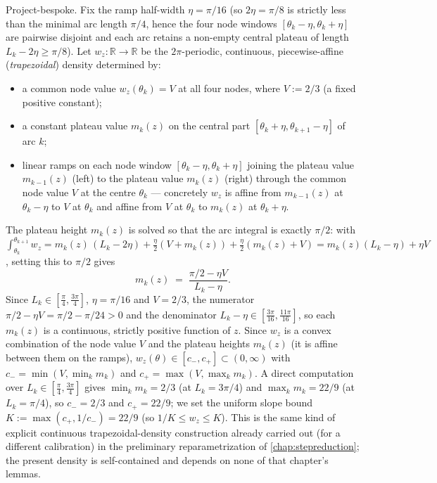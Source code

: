 \begin{definition}
  \label{def:align_density}
  Project-bespoke. Fix the ramp half-width $\eta=\pi/16$ (so $2\eta=\pi/8$ is
  strictly less than the minimal arc length $\pi/4$, hence the four node windows
  $[\theta_k-\eta,\theta_k+\eta]$ are pairwise disjoint and each arc retains a
  non-empty central plateau of length $L_k-2\eta\ge\pi/8$). Let $w_z:\mathbb R\to\mathbb R$
  be the $2\pi$-periodic, continuous, piecewise-affine
  (\emph{trapezoidal}) density determined by:
  \begin{itemize}
    \item a common node value $w_z(\theta_k)=V$ at all four nodes, where
      $V:=2/3$ (a fixed positive constant);
    \item a constant plateau value $m_k(z)$ on the central part
      $[\theta_k+\eta,\theta_{k+1}-\eta]$ of arc $k$;
    \item linear ramps on each node window $[\theta_k-\eta,\theta_k+\eta]$
      joining the plateau value $m_{k-1}(z)$ (left) to the plateau value
      $m_k(z)$ (right) through the common node value $V$ at the centre
      $\theta_k$ --- concretely $w_z$ is affine from $m_{k-1}(z)$ at
      $\theta_k-\eta$ to $V$ at $\theta_k$ and affine from $V$ at $\theta_k$ to
      $m_k(z)$ at $\theta_k+\eta$.
  \end{itemize}
  The plateau height $m_k(z)$ is solved so that the arc integral is exactly
  $\pi/2$: with $\int_{\theta_k}^{\theta_{k+1}}w_z =
  m_k(z)\,(L_k-2\eta) + \tfrac{\eta}{2}(V+m_k(z)) + \tfrac{\eta}{2}(m_k(z)+V)
  = m_k(z)(L_k-\eta) + \eta V$, setting this to $\pi/2$ gives
  \[
    m_k(z) \;=\; \frac{\pi/2-\eta V}{L_k-\eta}.
  \]
  Since $L_k\in[\tfrac\pi4,\tfrac{3\pi}4]$, $\eta=\pi/16$ and $V=2/3$, the numerator
  $\pi/2-\eta V = \pi/2-\pi/24>0$ and the denominator $L_k-\eta\in[\tfrac{3\pi}{16},\tfrac{11\pi}{16}]$,
  so each $m_k(z)$ is a continuous, strictly positive function of $z$. Since $w_z$
  is a convex combination of the node value $V$ and the plateau heights $m_k(z)$
  (it is affine between them on the ramps), $w_z(\theta)\in[c_-,c_+]\subset(0,\infty)$
  with $c_-=\min(V,\min_k m_k)$ and $c_+=\max(V,\max_k m_k)$. A direct computation
  over $L_k\in[\tfrac\pi4,\tfrac{3\pi}4]$ gives $\min_k m_k=2/3$ (at $L_k=3\pi/4$)
  and $\max_k m_k=22/9$ (at $L_k=\pi/4$), so $c_-=2/3$ and $c_+=22/9$; we set the
  uniform slope bound $K:=\max(c_+,1/c_-)=22/9$ (so $1/K\le w_z\le K$). This is the
  same kind of explicit continuous trapezoidal-density construction already carried
  out (for a different calibration) in the preliminary reparametrization of
  \cref{chap:stepreduction}; the present density is self-contained and depends on
  none of that chapter's lemmas.


\end{definition}
